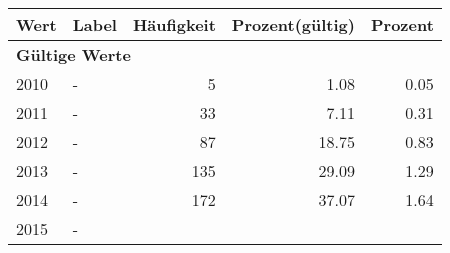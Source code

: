      \begin{longtable}{lXrrr}
     \toprule
     \textbf{Wert} & \textbf{Label} & \textbf{Häufigkeit} & \textbf{Prozent(gültig)} & \textbf{Prozent} \\
     \endhead
     \midrule
     \multicolumn{5}{l}{\textbf{Gültige Werte}}\\

     2010 &
     \multicolumn{1}{X}{ -  } &


       \num{5} &
       \num[round-mode=places,round-precision=2]{1.08} &
         \num[round-mode=places,round-precision=2]{0.05} \\

     2011 &
     \multicolumn{1}{X}{ -  } &


       \num{33} &
       \num[round-mode=places,round-precision=2]{7.11} &
         \num[round-mode=places,round-precision=2]{0.31} \\

     2012 &
     \multicolumn{1}{X}{ -  } &


       \num{87} &
       \num[round-mode=places,round-precision=2]{18.75} &
         \num[round-mode=places,round-precision=2]{0.83} \\

     2013 &
     \multicolumn{1}{X}{ -  } &


       \num{135} &
       \num[round-mode=places,round-precision=2]{29.09} &
         \num[round-mode=places,round-precision=2]{1.29} \\

     2014 &
     \multicolumn{1}{X}{ -  } &


       \num{172} &
       \num[round-mode=places,round-precision=2]{37.07} &
         \num[round-mode=places,round-precision=2]{1.64} \\

     2015 &
     \multicolumn{1}{X}{ -  } &



\end{longtable}
